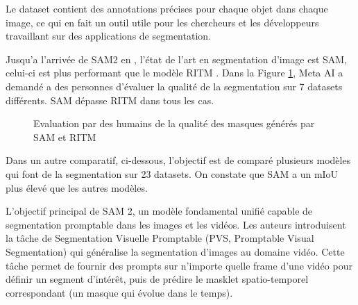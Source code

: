 Le dataset contient des annotations précises pour chaque objet dans chaque image, ce qui en fait un outil utile pour les chercheurs et les développeurs travaillant sur des applications de segmentation.

Jusqu'a l'arrivée de SAM2 en \citeyear{ravi_sam_2024}, l’état de l’art en segmentation d’image est SAM, celui-ci est plus performant que le modèle RITM \cite{sofiiuk_reviving_2021}. Dans la Figure \ref{fig:ch2_sam2_08_eval_sam_humain}, Meta AI a demandé a des personnes d’évaluer la qualité de la segmentation sur 7 datasets différents. SAM dépasse RITM dans tous les cas.

\begin{figure}[H]
    \centering
    \caption{Evaluation par des humains de la qualité des masques générés par SAM et RITM  \cite{kirillov_segment_2023}}
    \label{fig:ch2_sam2_08_eval_sam_humain}
\end{figure}

Dans un autre comparatif, ci-dessous, l’objectif est de comparé plusieurs modèles qui font de la segmentation sur 23 datasets. On constate que SAM a un mIoU plus élevé que les autres modèles.




L'objectif principal de SAM 2, un modèle fondamental unifié capable de segmentation promptable dans les images et les vidéos. Les auteurs introduisent la tâche de Segmentation Visuelle Promptable (PVS, Promptable Visual Segmentation) qui généralise la segmentation d'images au domaine vidéo. Cette tâche permet de fournir des prompts sur n'importe quelle frame d'une vidéo pour définir un segment d'intérêt, puis de prédire le masklet spatio-temporel correspondant (un masque qui évolue dans le temps).

